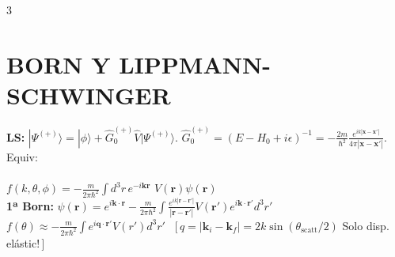 \documentclass[8pt,a4paper,fleqn]{extarticle} %
\begin{document}
\begin{multicols}{3}
\section{BORN Y LIPPMANN-SCHWINGER} 
\textbf{LS:} $|\Psi^{(+)}\rangle = |\phi\rangle + \hat{G}_0^{(+)} \hat{V} |\Psi^{(+)}\rangle$. $\hat{G}_0^{(+)} = (E - H_0 + i\epsilon)^{-1} = -\frac{2m}{\hbar^2}\frac{e^{ik|\mathbf{x-x'}|}}{4\pi |\mathbf{x-x'}|}$. Equiv:\\
\\
$f(k,\theta,\phi)= -\frac{m}{2\pi \hbar ^2 }\int d^3r \, e^{-i \mathbf{k r}} \,\, V(\mathbf{r})\psi(\mathbf{r})$
\\
\textbf{1ª Born:} $\psi(\mathbf{r})\! =\!e^{i\mathbf{k·r}} \!-\!\frac{m}{2\pi\hbar^2} \int \frac{e^{ik|\mathbf{r}-\mathbf{r}'|}}{|\mathbf{r}-\mathbf{r}'|} V(\mathbf{r}') e^{i\mathbf{k} \cdot \mathbf{r}'} d^3r'$ $f(\theta) \approx -\frac{m}{2\pi\hbar^2} \int e^{i\mathbf{q}\cdot\mathbf{r}'} V(r') d^3r'$ \;\;\; \, $[ \,q = |\mathbf{k}_i - \mathbf{k}_f| = 2k \sin(\theta_{\text{scatt}}/2)$ Solo disp. elástic!\,]\\


\end{multicols}
\end{document}
